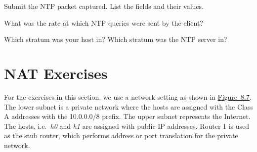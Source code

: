 \documentclass{../UTNetLab}
\begin{document}
    \begin{report}
        \item Submit the NTP packet captured.
            List the fields and their values.
        
        \item What was the rate at which NTP queries were sent by the client?
        
        \item Which stratum was your host in? Which stratum was the NTP server in?
    \end{report}

\part{NAT Exercises}
    For the exercises in this section, we use a network setting as shown in \hyperref[fig:8.7]{Figure~8.7}.
    The lower subnet is a private network where the hosts are assigned with the Class A addresses with the 10.0.0.0/8 prefix.
    The upper subnet represents the Internet.
    The hosts, i.e.\  \textit{h0} and \textit{h1} are assigned with public IP addresses.
    Router 1 is used as the stub router, which performs address or port translation for the private network.
\end{document}

